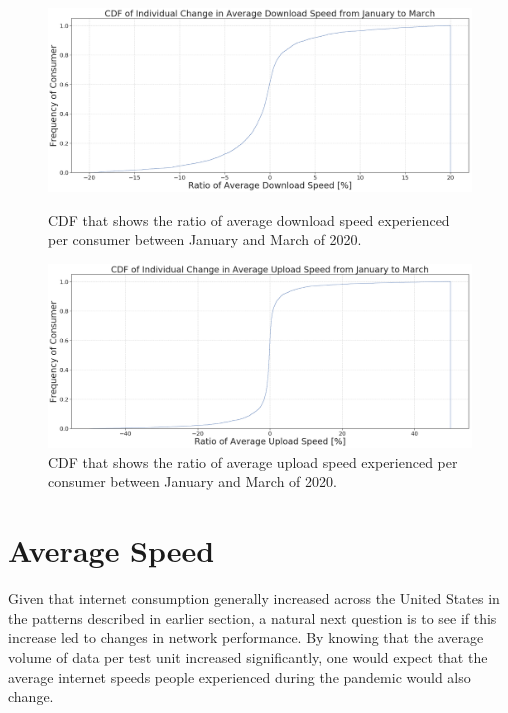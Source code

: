 \documentclass[conference,10pt]{IEEEtran}
\begin{document}
\begin{figure}[t]
  \begin{minipage}[t]{0.496\linewidth}
    \centering
    \includegraphics[width=0.98\linewidth]{figs/downspeed.PNG}
    \caption{CDF that shows the ratio of average download speed experienced per consumer between January and March of 2020.}
    \label{fig:downloadspeed2020}
  \end{minipage}
  \begin{minipage}[t]{0.496\linewidth}
    \centering
    \includegraphics[width=0.98\linewidth]{figs/uploadspeed.PNG}
    \caption{CDF that shows the ratio of average upload speed experienced per consumer between January and March of 2020.}
    \label{fig:uploadspeed2020}
  \end{minipage}
\end{figure}

\section{Average Speed}
\label{sec:average-speed}
Given that internet consumption generally increased across the United States in the patterns described in earlier section, a natural next question is to see if this increase led to changes in network performance. By knowing that the average volume of data per test unit increased significantly, one would expect that the average internet speeds people experienced during the pandemic would also change.
\end{document}
